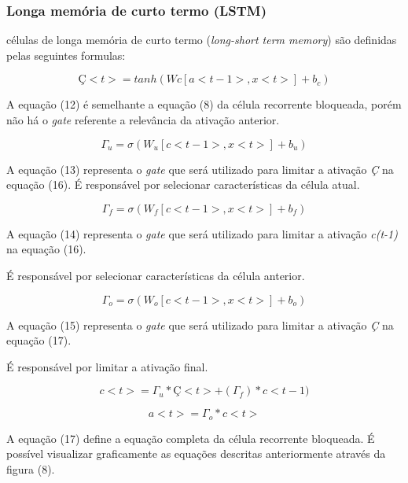 \documentclass[12pt]{article}
\begin{document}
\subsubsection{Longa memória de curto termo (LSTM)}

células de longa memória de curto termo (\textit{long-short term memory}) são definidas pelas seguintes formulas:

\begin{equation}
    Ç<t> = tanh(Wc[a<t-1>, x<t>]+b_c)
\end{equation}

A equação (12) é semelhante a equação (8) da célula recorrente bloqueada, porém não há o \textit{gate} referente a relevância da ativação anterior.

\begin{equation}
    \Gamma_u = \sigma(W_u[c<t-1>, x<t>]+b_u)
\end{equation}

A equação (13) representa o \textit{gate} que será utilizado para limitar a ativação \textit{Ç} na equação (16). É responsável por selecionar características da célula atual.

\begin{equation}
    \Gamma_f = \sigma(W_f[c<t-1>, x<t>]+b_f)
\end{equation}

A equação (14) representa o \textit{gate} que será utilizado para limitar a ativação \textit{c(t-1)} na equação (16).

É responsável por selecionar características da célula anterior.

\begin{equation}
    \Gamma_o = \sigma(W_o[c<t-1>, x<t>]+b_o)
\end{equation}

A equação (15) representa o \textit{gate} que será utilizado para limitar a ativação \textit{Ç} na equação (17).

É responsável por limitar a ativação final.

\begin{equation}
    c<t>=\Gamma_u*Ç<t>+(\Gamma_f)*c<t-1)
\end{equation}

\begin{equation}
    a<t>=\Gamma_o*c<t>
\end{equation}

A equação (17) define a equação completa da célula recorrente bloqueada. É possível visualizar graficamente as equações descritas anteriormente através da figura (8).
\end{document}
